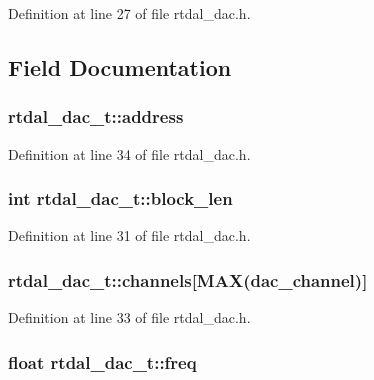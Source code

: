 Definition at line 27 of file rtdal\-\_\-dac.\-h.



\subsection{Field Documentation}
\hypertarget{structrtdal__dac__t_a61aaedfb5e9406837a83cfa0a57668bc}{
\subsubsection[{address}]{ rtdal\-\_\-dac\-\_\-t\-::address}}\label{structrtdal__dac__t_a61aaedfb5e9406837a83cfa0a57668bc}


Definition at line 34 of file rtdal\-\_\-dac.\-h.

\hypertarget{structrtdal__dac__t_a716854e8850dfab1ddbcbd779352c678}{
\subsubsection[{block\-\_\-len}]{\setlength{\rightskip}{0pt plus 5cm}int rtdal\-\_\-dac\-\_\-t\-::block\-\_\-len}}\label{structrtdal__dac__t_a716854e8850dfab1ddbcbd779352c678}


Definition at line 31 of file rtdal\-\_\-dac.\-h.

\hypertarget{structrtdal__dac__t_a89737e1e20878d8efc67ad8f47b72195}{
\subsubsection[{channels}]{ rtdal\-\_\-dac\-\_\-t\-::channels\mbox{[}{\bf M\-A\-X}(dac\-\_\-channel)\mbox{]}}}\label{structrtdal__dac__t_a89737e1e20878d8efc67ad8f47b72195}


Definition at line 33 of file rtdal\-\_\-dac.\-h.

\hypertarget{structrtdal__dac__t_afc905cd4e7aa8c25395806917a05a305}{
\subsubsection[{freq}]{\setlength{\rightskip}{0pt plus 5cm}float rtdal\-\_\-dac\-\_\-t\-::freq}}\label{structrtdal__dac__t_afc905cd4e7aa8c25395806917a05a305}


